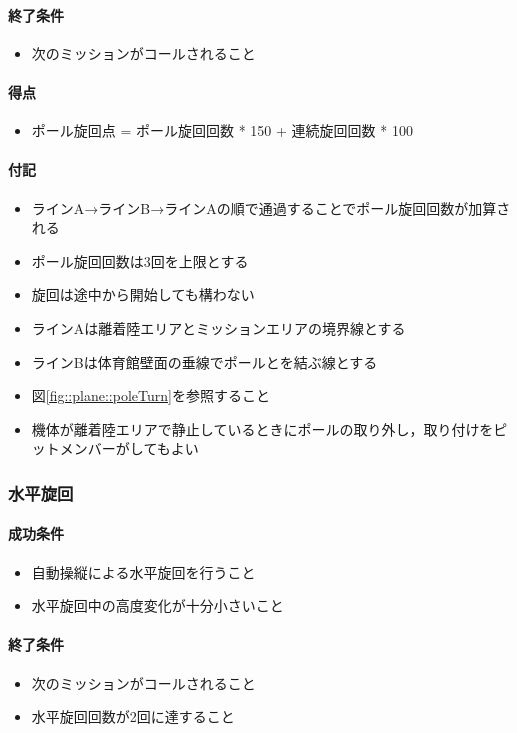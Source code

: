 \paragraph{終了条件}
\begin{itemize}
\item 次のミッションがコールされること
\end{itemize}
\paragraph{得点}
\begin{itemize}
\item ポール旋回点 = ポール旋回回数 * 150 + 連続旋回回数 * 100
\end{itemize}
\paragraph{付記}
\begin{itemize}
\item ラインA→ラインB→ラインAの順で通過することでポール旋回回数が加算される
\item ポール旋回回数は3回を上限とする
\item 旋回は途中から開始しても構わない
\item ラインAは離着陸エリアとミッションエリアの境界線とする
\item ラインBは体育館壁面の垂線でポールとを結ぶ線とする
  \item 図\ref{fig::plane::poleTurn}を参照すること
\item 機体が離着陸エリアで静止しているときにポールの取り外し，取り付けをピットメンバーがしてもよい
\end{itemize}
\subsubsection{水平旋回}
\paragraph{成功条件}
\begin{itemize}
\item 自動操縦による水平旋回を行うこと
\item 水平旋回中の高度変化が十分小さいこと
\end{itemize}
\paragraph{終了条件}
\begin{itemize}
\item 次のミッションがコールされること
\item 水平旋回回数が2回に達すること
\end{itemize}
